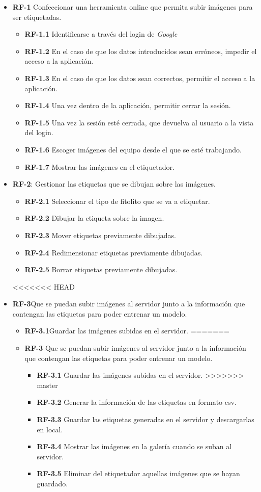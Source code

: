 \begin{itemize}
	\item \textbf{RF-1} Confeccionar una herramienta online que permita subir imágenes para ser etiquetadas.
	\begin{itemize}
		\item \textbf{RF-1.1}  Identificarse a través del login de \textit{Google}
		 	\item \textbf{RF-1.2} En el caso de que los datos introducidos sean erróneos, impedir el acceso a la aplicación. 
		 \item \textbf{RF-1.3} En el caso de que los datos sean correctos, permitir el acceso a la aplicación. 
		 \item \textbf{RF-1.4} Una vez dentro de la aplicación, permitir cerrar la sesión.
		 \item \textbf{RF-1.5} Una vez la sesión esté cerrada, que devuelva al usuario a la vista del login.
		\item \textbf{RF-1.6} Escoger imágenes del equipo desde el que se esté trabajando.
		\item \textbf{RF-1.7} Mostrar las imágenes en el etiquetador.
	\end{itemize}
	\item \textbf{RF-2}: Gestionar las etiquetas que se dibujan sobre las imágenes.
	\begin{itemize}
		\item \textbf{RF-2.1} Seleccionar el tipo de fitolito que se va a etiquetar.
		\item \textbf{RF-2.2} Dibujar la etiqueta sobre la imagen.
		\item \textbf{RF-2.3} Mover etiquetas previamente dibujadas.
		\item \textbf{RF-2.4} Redimensionar etiquetas previamente dibujadas.
		\item \textbf{RF-2.5} Borrar etiquetas previamente dibujadas.
	\end{itemize}
<<<<<<< HEAD
	\item \textbf{RF-3}Que se puedan subir imágenes al servidor junto a la información que contengan las etiquetas para poder entrenar un modelo. 
	\begin{itemize}
		\item \textbf{RF-3.1}Guardar las imágenes subidas en el servidor.
=======
	\item \textbf{RF-3} Que se puedan subir imágenes al servidor junto a la información que contengan las etiquetas para poder entrenar un modelo. 
	\begin{itemize}
		\item \textbf{RF-3.1} Guardar las imágenes subidas en el servidor.
>>>>>>> master
			\item \textbf{RF-3.2} Generar la información de las etiquetas en formato csv.
		\item \textbf{RF-3.3} Guardar las etiquetas generadas en el servidor y descargarlas en local.
		\item \textbf{RF-3.4} Mostrar las imágenes en la galería cuando se suban al servidor.
		\item \textbf{RF-3.5} Eliminar del etiquetador aquellas imágenes que se hayan guardado. 
	\end{itemize}


\end{itemize}
\end{itemize}
